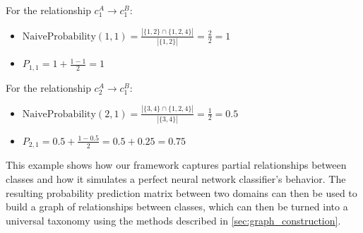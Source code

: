 For the relationship $c^A_1 \rightarrow c^B_1$:
\begin{itemize}
    \item $\text{NaiveProbability}(1,1) = \frac{|\{1,2\} \cap \{1,2,4\}|}{|\{1,2\}|} = \frac{2}{2} = 1$
    \item $P_{1,1} = 1 + \frac{1-1}{2} = 1$
\end{itemize}

For the relationship $c^A_2 \rightarrow c^B_1$:
\begin{itemize}
    \item $\text{NaiveProbability}(2,1) = \frac{|\{3,4\} \cap \{1,2,4\}|}{|\{3,4\}|} = \frac{1}{2} = 0.5$
    \item $P_{2,1} = 0.5 + \frac{1-0.5}{2} = 0.5 + 0.25 = 0.75$
\end{itemize}

This example shows how our framework captures partial relationships between classes
and how it simulates a perfect neural network classifier's behavior.
The resulting probability prediction matrix between two domains can then be used
to build a graph of relationships between classes,
which can then be turned into a universal taxonomy using the methods described in \autoref{sec:graph_construction}.
